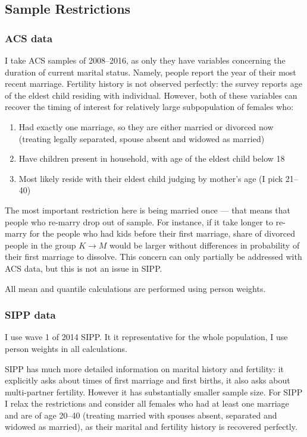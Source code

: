 \documentclass[12pt,letter]{article}
\begin{document}
\subsection{Sample Restrictions}
\subsubsection{ACS data}
I take ACS samples of 2008--2016, as only they have variables concerning the duration of current marital status. Namely, people report the year of their most recent marriage. Fertility history is not observed perfectly: the survey reports age of the eldest child residing with individual. However, both of these variables can recover the timing of interest for relatively large subpopulation of females who:
\begin{enumerate}
\item Had exactly one marriage, so they are either married or divorced now (treating legally separated, spouse absent and widowed as married)
\item Have children present in household, with age of the eldest child below 18
\item Most likely reside with their eldest child judging by mother's age (I pick 21--40)
\end{enumerate}

The most important restriction here is being married once --- that means that people who re-marry drop out of sample. For instance, if it take longer to re-marry for the people who had kids before their first marriage, share of divorced people in the group $K\to M$ would be larger without differences in probability of their first marriage to dissolve. This concern can only partially be addressed with ACS data, but this is not an issue in SIPP. 


All mean and quantile calculations are performed using person weights.

\subsubsection{SIPP data}

I use wave 1 of 2014 SIPP. It it representative for the whole population, I use person weights in all calculations.

SIPP has much more detailed information on marital history and fertility: it explicitly asks about times of first marriage and first births, it also asks about multi-partner fertility. However it has substantially smaller sample size. For SIPP I relax the restrictions and consider all females who had at least one marriage and are of age 20--40 (treating married with spouses absent, separated and widowed as married), as their marital and fertility history is recovered perfectly.
\end{document}
